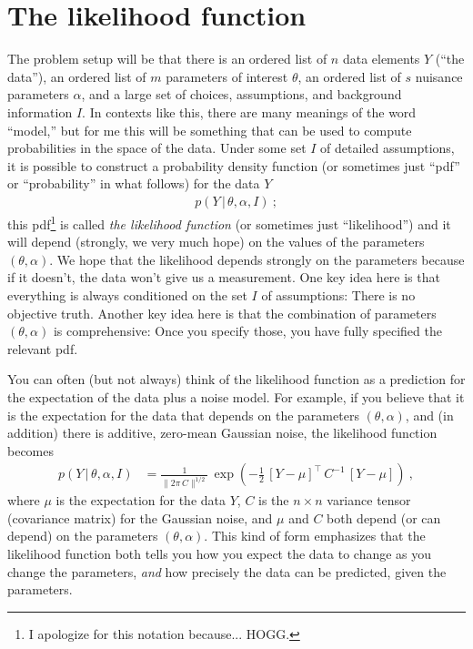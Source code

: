 \documentclass{article}
\newcommand{\given}{\,|\,}
\newcommand{\norm}[1]{\lVert{#1}\rVert}
\begin{document}
\section{The likelihood function}\label{sec:lf}
The problem setup will be that there is an ordered list of $n$ data elements $Y$ (``the data''), an ordered list of $m$ parameters of interest $\theta$, an ordered list of $s$ nuisance parameters $\alpha$, and a large set of choices, assumptions, and background information $I$.
In contexts like this, there are many meanings of the word ``model,'' but for me this will be something that can be used to compute probabilities in the space of the data.
Under some set $I$ of detailed assumptions, it is possible to construct a probability density function (or sometimes just ``pdf'' or ``probability'' in what follows) for the data $Y$
\begin{align}
    p(Y\given\theta,\alpha,I) ~;
\end{align}
this pdf\footnote{I apologize for this notation because... HOGG.} is called \emph{the likelihood function} (or sometimes just ``likelihood'') and it will depend (strongly, we very much hope) on the values of the parameters $(\theta, \alpha)$.
We hope that the likelihood depends strongly on the parameters because if it doesn't, the data won't give us a measurement.
One key idea here is that everything is always conditioned on the set $I$ of assumptions: There is no objective truth.
Another key idea here is that the combination of parameters $(\theta,\alpha)$ is comprehensive: Once you specify those, you have fully specified the relevant pdf.

You can often (but not always) think of the likelihood function as a prediction for the expectation of the data plus a noise model.
For example, if you believe that it is the expectation for the data that depends on the parameters $(\theta, \alpha)$, and (in addition) there is additive, zero-mean Gaussian noise, the likelihood function becomes
\begin{align}
    p(Y\given\theta,\alpha,I) &= \frac{1}{\norm{2\pi\,C}^{1/2}}\,\exp\left(-\frac{1}{2}\,[Y - \mu]^\top\,C^{-1}\,[Y - \mu]\right) ~,
\end{align}
where $\mu$ is the expectation for the data $Y$,
$C$ is the $n\times n$ variance tensor (covariance matrix) for the Gaussian noise,
and $\mu$ and $C$ both depend (or can depend) on the parameters $(\theta,\alpha)$.
This kind of form emphasizes that the likelihood function both tells you how you expect the data to change as you change the parameters, \emph{and} how precisely the data can be predicted, given the parameters.
\end{document}
